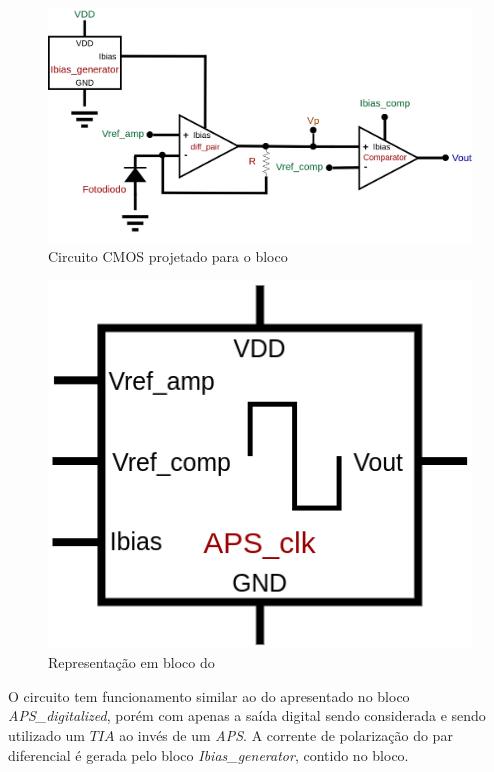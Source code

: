 \begin{figure}[htb]
 \label{\NomePFig}
 \centering
    \centering
    \caption{Circuito CMOS projetado para o bloco \NomeBloco} 
    \includegraphics[scale=0.3]{Circuitos/APS_clk.png}
\end{figure}

\begin{figure}[htb]
 \centering
    \centering
    \caption{Representa{\c c}\~ao em bloco do \NomeBloco} \label{\NomeSFig}
    \includegraphics[scale=0.3]{Circuitos/APS_clk_block.png}
\end{figure}

O circuito tem funcionamento similar ao do apresentado no bloco \emph{APS\_digitalized}, por\'em com apenas a sa\'ida digital sendo considerada e sendo utilizado um $TIA$ ao inv\'es de um \emph{APS}. A corrente de polariza{\c c}\~ao do par diferencial \'e gerada pelo bloco \emph{Ibias\_generator}, contido no bloco.

